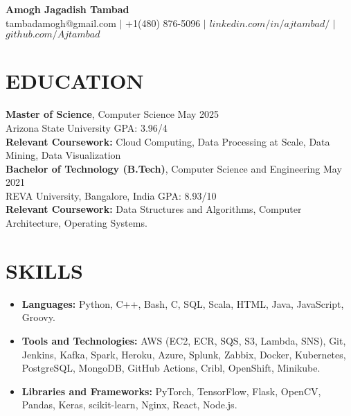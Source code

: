\documentclass[a4paper,9pt]{extarticle}
\begin{document}
\pagestyle{empty}

\begin{center}
\textbf{\huge Amogh Jagadish Tambad}\\[2pt] %
tambadamogh@gmail.com \hspace{1mm} $|$ \hspace{1mm} +1(480) 876-5096  \hspace{1mm} $|$ \hspace{1mm} $linkedin.com/in/ajtambad/$ \hspace{1mm} $|$ \hspace{1mm} $github.com/Ajtambad$
\end{center}

\section*{EDUCATION}
\noindent
\textbf{Master of Science}, Computer Science \hfill May 2025 \\ %
Arizona State University
\hfill GPA: 3.96/4\\ %
\textbf{Relevant Coursework:} Cloud Computing, Data Processing at Scale, Data Mining, Data Visualization\\

\noindent
\textbf{Bachelor of Technology (B.Tech)}, Computer Science and Engineering \hfill May 2021 \\ %
REVA University, Bangalore, India \hfill GPA: 8.93/10\\ %
\textbf{Relevant Coursework:} Data Structures and Algorithms, Computer Architecture, Operating Systems.

\section*{SKILLS}
\begin{itemize}
    \item \textbf{Languages:} Python, C++, Bash, C, SQL, Scala, HTML, Java, JavaScript, Groovy. %
    \item \textbf{Tools and Technologies:} AWS (EC2, ECR, SQS, S3, Lambda, SNS), Git, Jenkins, Kafka, Spark, Heroku, Azure, Splunk, Zabbix, Docker, Kubernetes, PostgreSQL, MongoDB, GitHub Actions, Cribl, OpenShift, Minikube. %
    \item \textbf{Libraries and Frameworks:} PyTorch, TensorFlow, Flask, OpenCV, Pandas, Keras, scikit-learn, Nginx, React, Node.js.
\end{itemize}
\end{document}
